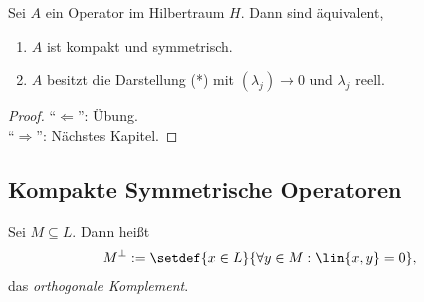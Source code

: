 \begin{prop}
\label{prop:1.26}
Sei $A$ ein Operator im Hilbertraum $H$. Dann sind äquivalent,
\begin{enumerate}[label=(\roman{*})]
  \item $A$ ist kompakt und symmetrisch.
  \item $A$ besitzt die Darstellung (*) mit $(\lambda_j)\to 0$ und $\lambda_j$
  reell.\fishhere
\end{enumerate}
\end{prop}
\begin{proof}
``$\Leftarrow$'': Übung.\\ 
``$\Rightarrow$'': Nächstes Kapitel.\qedhere
\end{proof}

\subsection{Kompakte Symmetrische Operatoren}

\begin{defn}
\label{defn:1.27}
Sei $M\subseteq L$. Dann heißt
\begin{align*}
M^\bot := \setdef{x\in L}{\forall y\in M: \lin{x,y}=0},
\end{align*}
das \emph{orthogonale Komplement}.\fishhere
\end{defn}

